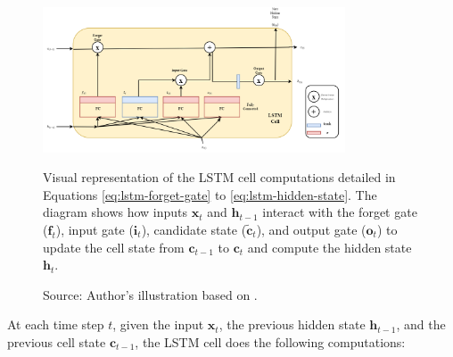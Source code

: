 \begin{figure}[htbp]
    \centering
    \includegraphics[width=0.8\textwidth]{figures/lstmcell.png}
    \caption[LSTM Cell]{Visual representation of the LSTM cell computations detailed in Equations \ref{eq:lstm-forget-gate} to \ref{eq:lstm-hidden-state}. The diagram shows how inputs $\bm{x}_t$ and $\bm{h}_{t-1}$ interact with the forget gate ($\bm{f}_t$), input gate ($\bm{i}_t$), candidate state ($\bm{\tilde{c}}_t$), and output gate ($\bm{o}_t$) to update the cell state from $\bm{c}_{t-1}$ to $\bm{c}_t$ and compute the hidden state $\bm{h}_t$.}
    \caption*{Source: Author's illustration based on \textcite{geron2022hands}.}
    \label{fig:lstm_cell}
\end{figure}
At each time step \( t \), given the input \( \bm{x}_t \), the previous hidden state \( \bm{h}_{t-1} \), and the previous cell state \( \bm{c}_{t-1} \), the LSTM cell does the following computations:

